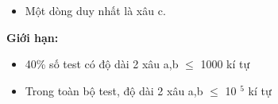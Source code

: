 \begin{itemize}
	\item     Một dòng duy nhất là xâu c.   
\end{itemize}

\textbf{     Giới hạn:    }
\begin{itemize}
	\item     40\% số test có độ dài 2 xâu a,b  $\le$  1000 kí tự   
	\item     Trong toàn bộ test, độ dài 2 xâu a,b  $\le$  10    $^     5    $    kí tự   
\end{itemize}

\